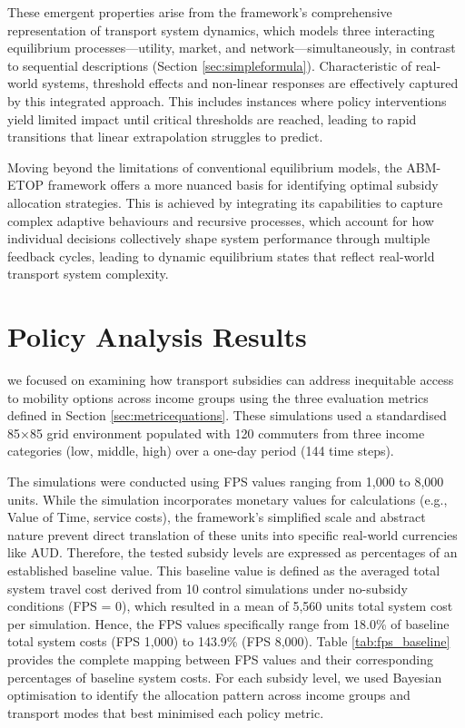 \documentclass[a4paper,fleqn]{cas-sc}
\begin{document}
These emergent properties arise from the framework's comprehensive representation of transport system dynamics, which models three interacting equilibrium processes—utility, market, and network—simultaneously, in contrast to sequential descriptions (Section \ref{sec:simpleformula}). Characteristic of real-world systems, threshold effects and non-linear responses are effectively captured by this integrated approach. This includes instances where policy interventions yield limited impact until critical thresholds are reached, leading to rapid transitions that linear extrapolation struggles to predict.

Moving beyond the limitations of conventional equilibrium models, the ABM-ETOP framework offers a more nuanced basis for identifying optimal subsidy allocation strategies. This is achieved by integrating its capabilities to capture complex adaptive behaviours and recursive processes, which account for how individual decisions collectively shape system performance through multiple feedback cycles, leading to dynamic equilibrium states that reflect real-world transport system complexity.

\section{Policy Analysis Results}\label{sec:results}
we focused on examining how transport subsidies can address inequitable access to mobility options across income groups using the three evaluation metrics defined in Section \ref{sec:metricequations}. These simulations used a standardised 85×85 grid environment populated with 120 commuters from three income categories (low, middle, high) over a one-day period (144 time steps).

The simulations were conducted using FPS values ranging from 1,000 to 8,000 units. While the simulation incorporates monetary values for calculations (e.g., Value of Time, service costs), the framework's simplified scale and abstract nature prevent direct translation of these units into specific real-world currencies like AUD. Therefore, the tested subsidy levels are expressed as percentages of an established baseline value. This baseline value is defined as the averaged total system travel cost derived from 10 control simulations under no-subsidy conditions (FPS = 0), which resulted in a mean of 5,560 units total system cost per simulation. Hence, the FPS values specifically range from 18.0\% of baseline total system costs (FPS 1,000) to 143.9\% (FPS 8,000). Table \ref{tab:fps_baseline} provides the complete mapping between FPS values and their corresponding percentages of baseline system costs. For each subsidy level, we used Bayesian optimisation to identify the allocation pattern across income groups and transport modes that best minimised each policy metric.
\end{document}
